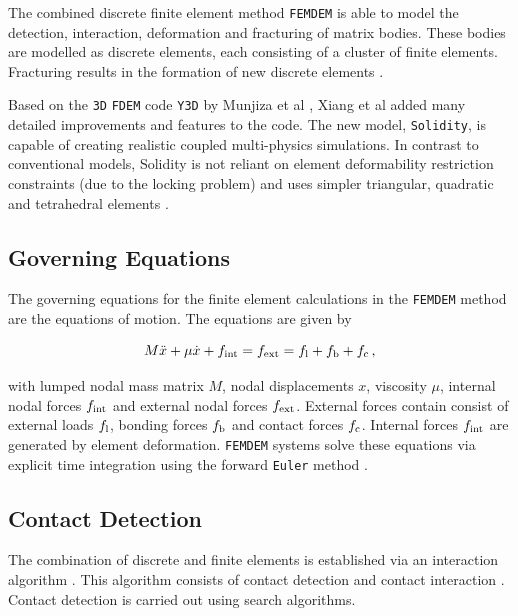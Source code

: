 \documentclass[format=acmtog,12pt,screen=true,review=false,natbib=false,]{acmart}
\begin{document}
\bigbreak
The combined discrete finite element method \texttt{FEMDEM} \cite{Wan18, Mun95, Mun99, Mun04, Mun12, Mun13, Guo16, Gao14, Xu14, Che18} is able to model the detection, interaction, deformation and fracturing of matrix bodies. These bodies are modelled as discrete elements, each consisting of a cluster of finite elements. Fracturing results in the formation of new discrete elements \cite{Mun13}.

\bigbreak
Based on the \texttt{3D} \texttt{FDEM} code \texttt{Y3D} by Munjiza et al \cite{Mun95, Mun99, Mun04}, Xiang et al \cite{Xia09} added many detailed improvements and features to the code. The new model, \texttt{Solidity}, is capable of creating realistic coupled multi-physics simulations. In contrast to conventional models, Solidity is not reliant on element deformability restriction constraints (due to the locking problem) and uses simpler triangular, quadratic and tetrahedral elements \cite{Lat15}. 

\subsection{Governing Equations}

The governing equations for the finite element calculations in the \texttt{FEMDEM} method are the equations of motion. The equations are given by

\begin{equation}
    M\ddot{x}+\mu\dot{x}+f_{\rm{int}}=f_{\rm{ext}}=f_{\rm{l}}+f_{\rm{b}}+f_{\rm{c}}\,,
\end{equation}

with lumped nodal mass matrix $M$, nodal displacements $x$, viscosity $\mu$, internal nodal forces $f_{\rm{int}}$ and external nodal forces $f_{\rm{ext}}$. External forces contain consist of external loads $f_{\rm{l}}$, bonding forces $f_{\rm{b}}$ and contact forces $f_{\rm{c}}$. Internal forces $f_{\rm{int}}$ are generated by element deformation. \texttt{FEMDEM} systems solve these equations via explicit time integration using the forward \texttt{Euler} method \cite{Lei16}.

\subsection{Contact Detection}

The combination of discrete and finite elements is established via an interaction algorithm \cite{Lei16}. This algorithm consists of contact detection \cite{Che15} and contact interaction \cite{Mun13}. Contact detection is carried out using search algorithms. 
\end{document}
